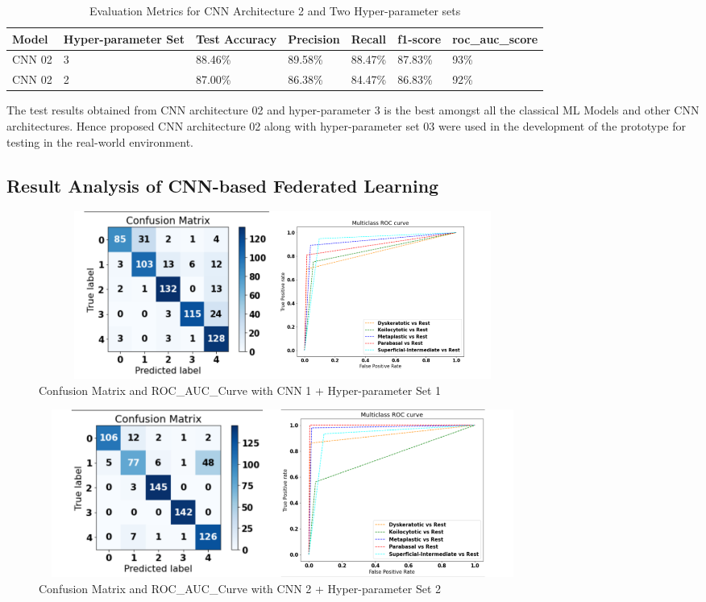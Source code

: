 \begin{table}[H]
    \centering
    \caption{Evaluation Metrics for CNN Architecture 2 and Two Hyper-parameter sets}
    \begin{tabular}{|l|l|l|l|l|l|l|}
    \hline
        Model & Hyper-parameter Set & Test Accuracy & Precision & Recall & f1-score & roc\_auc\_score \\ \hline
        CNN 02 & 3 & 88.46\% & 89.58\% & 88.47\% & 87.83\% & 93\% \\ \hline
        CNN 02 & 2 & 87.00\% & 86.38\% & 84.47\% & 86.83\% & 92\% \\ \hline
    \end{tabular}
\end{table}

The test results obtained from CNN architecture 02 and hyper-parameter 3 is the best amongst all the classical ML Models and other CNN architectures. Hence proposed CNN architecture 02 along with hyper-parameter set 03 were used in the development of the prototype for testing in the real-world environment.


\subsection{Result Analysis of CNN-based Federated Learning}
\begin{figure}[H]
\centering
\includegraphics[width=160mm,height=55mm]{figures/cnn1.png}
\caption{Confusion Matrix and ROC\_AUC\_Curve with CNN 1 + Hyper-parameter Set 1}
\label{DLAccuracy}
\end{figure}

\begin{figure}[H]
\centering
\includegraphics[width=160mm,height=55mm]{figures/cnn2.png}
\caption{Confusion Matrix and ROC\_AUC\_Curve with CNN 2 + Hyper-parameter Set 2}
\label{DLAccuracy}
\end{figure}

